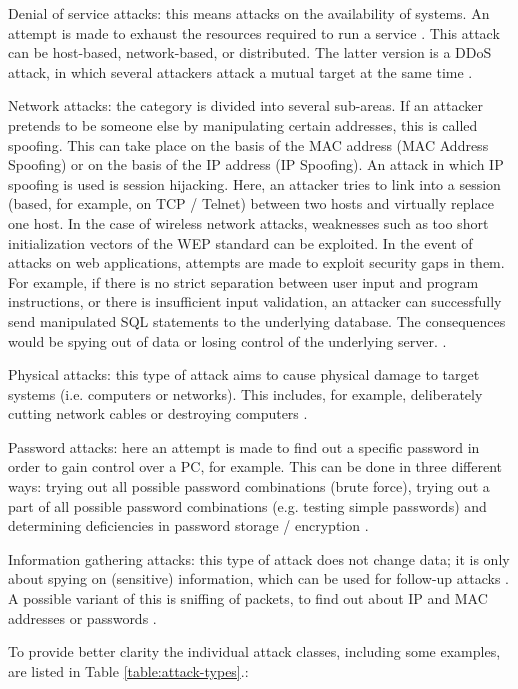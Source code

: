 \documentclass[conference]{IEEEtran}
\begin{document}
\smallskip Denial of service attacks: this means attacks on the availability of systems.  An attempt is made to exhaust the resources required to run a service \cite{b6}. This attack can be host-based, network-based, or distributed. The latter version is a DDoS attack, in which several attackers attack a mutual target at the same time \cite{b2}.

\smallskip Network attacks: the category is divided into several sub-areas. If an attacker pretends to be someone else by manipulating certain addresses, this is called spoofing. This can take place on the basis of the MAC address (MAC Address Spoofing) or on the basis of the IP address (IP Spoofing). An attack in which IP spoofing is used is session hijacking. Here, an attacker tries to link into a session (based, for example, on TCP / Telnet) between two hosts and virtually replace one host. In the case of wireless network attacks, weaknesses such as too short initialization vectors of the WEP standard can be exploited. In the event of attacks on web applications, attempts are made to exploit security gaps in them.  For example, if there is no strict separation between user input and program instructions, or there is insufficient input validation, an attacker can successfully send manipulated SQL statements to the underlying database. The consequences would be spying out of data or losing control of the underlying server. \cite{b2}.

\smallskip Physical attacks: this type of attack aims to cause physical damage to target systems (i.e. computers or networks). This includes, for example, deliberately cutting network cables or destroying computers \cite{b2}.

\smallskip Password attacks: here an attempt is made to find out a specific password in order to gain control over a PC, for example. This can be done in three different ways: trying out all possible password combinations (brute force), trying out a part of all possible password combinations (e.g. testing simple passwords) and determining deficiencies in password storage / encryption \cite{b2,b5}.

\smallskip Information gathering attacks: this type of attack does not change data; it is only about spying on (sensitive) information, which can be used for follow-up attacks \cite{b5}. A possible variant of this is sniffing of packets, to find out about IP and MAC addresses or passwords \cite{b2}.

\smallskip To provide better clarity the individual attack classes, including some examples, are listed in Table \ref{table:attack-types}.:
\end{document}
